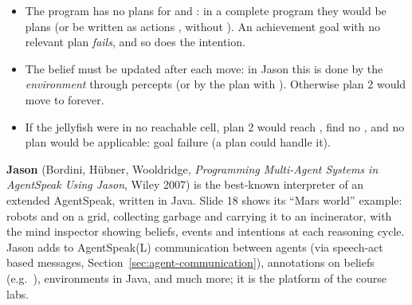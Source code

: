 \begin{nbwarning}
\begin{itemize}[nosep]
  \item The program has no plans for  and : in a
        complete program they would be plans (or be written as actions ,
         without \code{!}). An achievement goal with no relevant plan
        \emph{fails}, and so does the intention.
  \item The belief  must be updated after each move: in
        Jason this is done by the \emph{environment} through percepts (or by the plan with
        ). Otherwise plan 2 would move to  forever.
  \item If the jellyfish were in no reachable cell, plan 2 would reach , find no
        , and no plan would be applicable: goal failure (a
         plan could handle it).
\end{itemize}
\end{nbwarning}

\begin{nbwhy}
\textbf{Jason} (Bordini, H\"ubner, Wooldridge, \emph{Programming Multi-Agent Systems in
AgentSpeak Using Jason}, Wiley 2007) is the best-known interpreter of an extended
AgentSpeak, written in Java. Slide 18 shows its ``Mars world'' example: robots  and
 on a grid, collecting garbage  and carrying it to an incinerator, with the
mind inspector showing beliefs, events and intentions at each reasoning cycle. Jason adds to
AgentSpeak(L) communication between agents (via speech-act based messages,
Section~\ref{sec:agent-communication}), annotations on beliefs (e.g.\ ),
environments in Java, and much more; it is the platform of the course labs.
\end{nbwhy}
